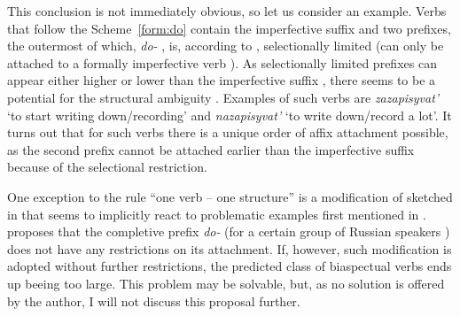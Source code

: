 This conclusion is not immediately obvious, so let us consider an example. Verbs that follow the Scheme~\ref{form:do} contain the imperfective suffix   and two prefixes, the outermost of which, \textit{do-}  , is, according to \citet{Tatevosov:09}, selectionally limited (can only be attached to a formally imperfective verb ). As selectionally limited prefixes  can appear either higher or lower than the imperfective suffix  , there seems to be a potential for the structural ambiguity . Examples of such verbs are \textit{zazapisyvat'} `to start writing down/recording' and  \textit{nazapisyvat'} `to write down/record a lot'. It turns out that for such verbs there is a unique order of affix attachment possible, as the second prefix cannot be attached earlier than the imperfective suffix   because of the selectional restriction.

One exception to the rule ``one verb -- one structure'' is a modification of \citet{Tatevosov:09} sketched in \citet{Tatevosov:13} that seems to implicitly react to problematic examples first mentioned in \citet{Zinova:12}. \citet{Tatevosov:13} proposes that the completive  prefix \textit{do-}   (for a certain group of Russian speakers ) does not have any restrictions on its attachment. If, however, such modification is adopted without further restrictions, the predicted class of biaspectual verbs  ends up beeing too large. This problem may be solvable, but, as no solution is offered by the author, I will not discuss this proposal further.

